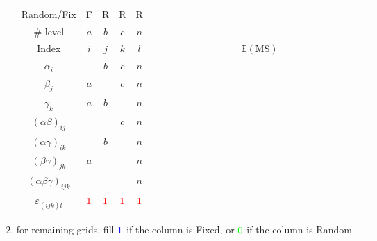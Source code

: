 \begin{enumerate}[topsep=2pt,itemsep=2pt]
    \begin{table}[H]
        \centering
        \renewcommand\arraystretch{1}
        \begin{tabular}{cccccc}
            \hline
            \hline
            Random/Fix                      &F      &R      &R      &R      &$ \qquad\qquad\qquad\qquad\qquad\qquad\qquad\qquad\qquad\qquad\qquad$\\
            \# level                        &$ a $  &$ b $  &$ c $  &$ n $  &\\
            Index                           &$ i $  &$ j $  &$ k $  &$ l $  &$ \mathbb{E}\left( \mathrm{MS}  \right)  $\\
            \hline
            $ \alpha _i $                   &       &$ b $  &$ c $  &$ n $  &\\
            $ \beta _j $                    &$ a $  &       &$ c $  &$ n $  &\\
            $ \gamma _k $                   &$ a $  &$ b $  &       &$ n $  &\\
            $ (\alpha \beta )_{ij} $        &       &       &$ c $  &$ n $  &\\
            $ (\alpha \gamma )_{ik} $       &       &$ b $  &       &$ n $  &\\
            $ (\beta \gamma )_{jk} $        &$ a $  &       &       &$ n $  &\\
            $ (\alpha \beta \gamma )_{ijk} $&       &       &       &$ n $  &\\
            $ \varepsilon _{(ijk)l} $       &$ \color{red}1 $  &$ \color{red}1 $  &$ \color{red}1 $  &$ \color{red}1 $  &\\
            \hline
            \hline
        \end{tabular}
        \label{}
    \end{table}


    \item for remaining grids, fill $ \color{blue}1     $ if the column is Fixed, or $ \color{green} 0$ if the column is Random
    

\end{enumerate}
